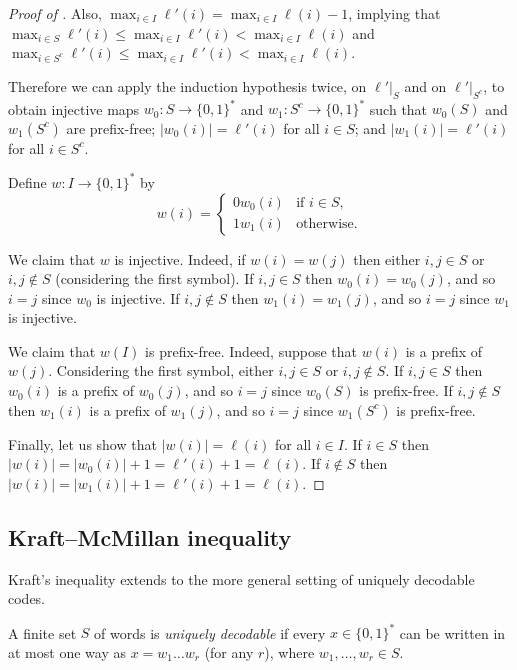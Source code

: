 \begin{proof}[Proof of ]
Also, $\max_{i \in I} \ell'(i) = \max_{i \in I} \ell(i) - 1$, implying that $\max_{i \in S} \ell'(i) \leq \max_{i \in I} \ell'(i) < \max_{i \in I} \ell(i)$ and $\max_{i \in S^c} \ell'(i) \leq \max_{i \in I} \ell'(i) < \max_{i \in I} \ell(i)$.

Therefore we can apply the induction hypothesis twice, on $\ell'|_S$ and on $\ell'|_{S^c}$, to obtain injective maps $w_0\colon S \to \{0,1\}^*$ and $w_1\colon S^c \to \{0,1\}^*$ such that $w_0(S)$ and $w_1(S^c)$ are prefix-free; $|w_0(i)| = \ell'(i)$ for all $i \in S$; and $|w_1(i)| = \ell'(i)$ for all $i \in S^c$.

Define $w\colon I \to \{0,1\}^*$ by
\[
 w(i) =
 \begin{cases}
     0 w_0(i) & \text{if } i \in S, \\
     1 w_1(i) & \text{otherwise}.
 \end{cases}
\]

We claim that $w$ is injective. Indeed, if $w(i) = w(j)$ then either $i,j \in S$ or $i,j \notin S$ (considering the first symbol). If $i,j \in S$ then $w_0(i) = w_0(j)$, and so $i = j$ since $w_0$ is injective. If $i,j \notin S$ then $w_1(i) = w_1(j)$, and so $i = j$ since $w_1$ is injective.

We claim that $w(I)$ is prefix-free. Indeed, suppose that $w(i)$ is a prefix of $w(j)$. Considering the first symbol, either $i,j \in S$ or $i,j \notin S$. If $i,j \in S$ then $w_0(i)$ is a prefix of $w_0(j)$, and so $i = j$ since $w_0(S)$ is prefix-free. If $i,j \notin S$ then $w_1(i)$ is a prefix of $w_1(j)$, and so $i = j$ since $w_1(S^c)$ is prefix-free. 

Finally, let us show that $|w(i)| = \ell(i)$ for all $i \in I$. If $i \in S$ then $|w(i)| = |w_0(i)| + 1 = \ell'(i) + 1 = \ell(i)$. If $i \notin S$ then $|w(i)| = |w_1(i)| + 1 = \ell'(i) + 1 = \ell(i)$.
\end{proof}

\pagebreak

\subsection{Kraft--McMillan inequality}

Kraft's inequality extends to the more general setting of uniquely decodable codes.

\begin{definition}
A finite set $S$ of words is \emph{uniquely decodable} if every $x \in \{0,1\}^*$ can be written in at most one way as $x = w_1 \dots w_r$ (for any $r$), where $w_1,\dots,w_r \in S$.
\end{definition}

